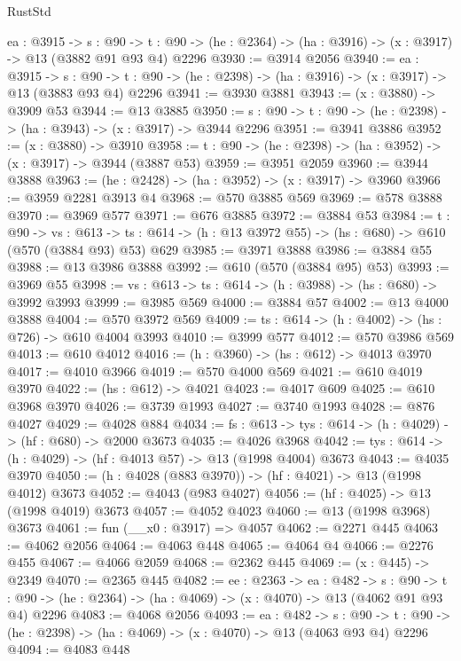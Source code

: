\begin{lexlean}{RustStd}
\begin{coremodule}
  {ea : @3915} ->
  {s : @90} ->
  {t : @90} -> (he : @2364) -> (ha : @3916) -> (x : @3917) -> @13 (@3882 @91 @93 @4) @2296
@3930 := @3914 @2056
@3940 := {ea : @3915} ->
  {s : @90} -> {t : @90} -> (he : @2398) -> (ha : @3916) -> (x : @3917) -> @13 (@3883 @93 @4) @2296
@3941 := @3930 @3881
@3943 := (x : @3880) -> @3909 @53
@3944 := @13 @3885
@3950 := {s : @90} -> {t : @90} -> (he : @2398) -> (ha : @3943) -> (x : @3917) -> @3944 @2296
@3951 := @3941 @3886
@3952 := (x : @3880) -> @3910
@3958 := {t : @90} -> (he : @2398) -> (ha : @3952) -> (x : @3917) -> @3944 (@3887 @53)
@3959 := @3951 @2059
@3960 := @3944 @3888
@3963 := (he : @2428) -> (ha : @3952) -> (x : @3917) -> @3960
@3966 := @3959 @2281 @3913 @4
@3968 := @570 @3885 @569
@3969 := @578 @3888
@3970 := @3969 @577
@3971 := @676 @3885
@3972 := @3884 @53
@3984 := {t : @90} ->
  {vs : @613} ->
  {ts : @614} -> (h : @13 @3972 @55) -> (hs : @680) -> @610 (@570 (@3884 @93) @53) @629
@3985 := @3971 @3888
@3986 := @3884 @55
@3988 := @13 @3986 @3888
@3992 := @610 (@570 (@3884 @95) @53)
@3993 := @3969 @55
@3998 := {vs : @613} -> {ts : @614} -> (h : @3988) -> (hs : @680) -> @3992 @3993
@3999 := @3985 @569
@4000 := @3884 @57
@4002 := @13 @4000 @3888
@4004 := @570 @3972 @569
@4009 := {ts : @614} -> (h : @4002) -> (hs : @726) -> @610 @4004 @3993
@4010 := @3999 @577
@4012 := @570 @3986 @569
@4013 := @610 @4012
@4016 := (h : @3960) -> (hs : @612) -> @4013 @3970
@4017 := @4010 @3966
@4019 := @570 @4000 @569
@4021 := @610 @4019 @3970
@4022 := (hs : @612) -> @4021
@4023 := @4017 @609
@4025 := @610 @3968 @3970
@4026 := @3739 @1993
@4027 := @3740 @1993
@4028 := @876 @4027
@4029 := @4028 @884
@4034 := {fs : @613} -> {tys : @614} -> (h : @4029) -> (hf : @680) -> @2000 @3673
@4035 := @4026 @3968
@4042 := {tys : @614} -> (h : @4029) -> (hf : @4013 @57) -> @13 (@1998 @4004) @3673
@4043 := @4035 @3970
@4050 := (h : @4028 (@883 @3970)) -> (hf : @4021) -> @13 (@1998 @4012) @3673
@4052 := @4043 (@983 @4027)
@4056 := (hf : @4025) -> @13 (@1998 @4019) @3673
@4057 := @4052 @4023
@4060 := @13 (@1998 @3968) @3673
@4061 := fun (__x0 : @3917) => @4057
@4062 := @2271 @445
@4063 := @4062 @2056
@4064 := @4063 @448
@4065 := @4064 @4
@4066 := @2276 @455
@4067 := @4066 @2059
@4068 := @2362 @445
@4069 := (x : @445) -> @2349
@4070 := @2365 @445
@4082 := {ee : @2363} ->
  {ea : @482} ->
  {s : @90} ->
  {t : @90} -> (he : @2364) -> (ha : @4069) -> (x : @4070) -> @13 (@4062 @91 @93 @4) @2296
@4083 := @4068 @2056
@4093 := {ea : @482} ->
  {s : @90} -> {t : @90} -> (he : @2398) -> (ha : @4069) -> (x : @4070) -> @13 (@4063 @93 @4) @2296
@4094 := @4083 @448

\end{coremodule}
\end{lexlean}
